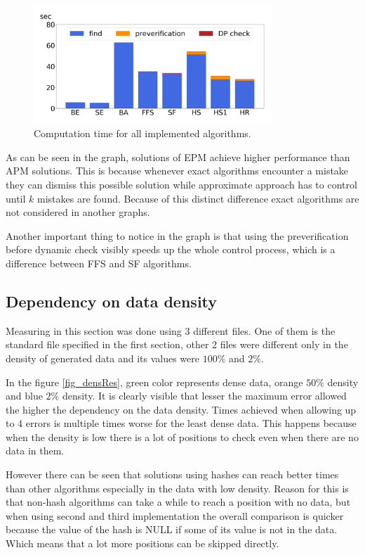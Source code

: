\begin{figure}
\centering
\includegraphics[width=0.8\textwidth]{img/baseAll}
\caption{Computation time for all implemented algorithms.}
\label{fig_compT}
\end{figure}

As can be seen in the graph, solutions of EPM achieve higher performance than APM solutions. This is because whenever exact algorithms encounter a mistake they can dismiss this possible solution while approximate approach has to control until $k$ mistakes are found. Because of this distinct difference exact algorithms are not considered in another graphs.

Another important thing to notice in the graph is that using the preverification before dynamic check visibly speeds up the whole control process, which is a difference between FFS and SF algorithms. 

\subsection{Dependency on data density}
Measuring in this section was done using 3 different files. One of them is the standard file specified in the first section, other 2 files were different only in the density of generated data and its values were $100 \%$ and $2 \%$.

In the figure \ref{fig_densRes}, green color represents dense data, orange $50 \%$ density and blue $2 \%$ density. It is clearly visible that lesser the maximum error allowed the higher the dependency on the data density. Times achieved when allowing up to 4 errors is multiple times worse for the least dense data. This happens because when the density is low there is a lot of positions to check even when there are no data in them. 

However there can be seen that solutions using hashes can reach better times than other algorithms especially in the data with low density. Reason for this is that non-hash algorithms can take a while to reach a position with no data, but when using second and third implementation the overall comparison is quicker because the value of the hash is NULL if some of its value is not in the data. Which means that a lot more positions can be skipped directly.

